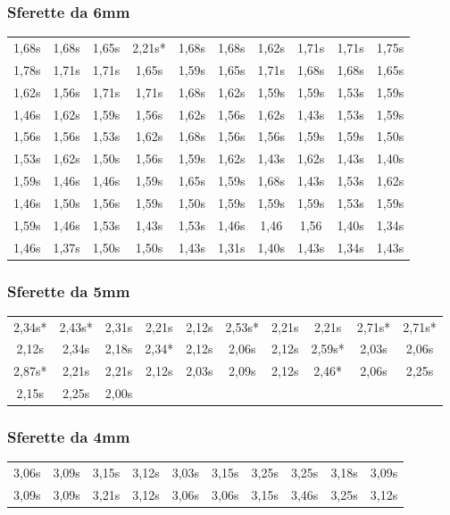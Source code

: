 \subsubsection{Sferette da 6mm}
\begin{tabular}{c|c|c|c|c|c|c|c|c|c}
\toprule
 1,68s & 1,68s & 1,65s & 2,21s* & 1,68s & 1,68s & 1,62s & 1,71s & 1,71s & 1,75s \\
 1,78s & 1,71s & 1,71s & 1,65s & 1,59s  & 1,65s  & 1,71s  & 1,68s & 1,68s & 1,65s \\
\midrule
 1,62s & 1,56s & 1,71s & 1,71s & 1,68s & 1,62s & 1,59s & 1,59s & 1,53s & 1,59s \\
 1,46s & 1,62s & 1,59s & 1,56s & 1,62s & 1,56s & 1,62s & 1,43s & 1,53s & 1,59s \\
\midrule
 1,56s & 1,56s & 1,53s & 1,62s & 1,68s & 1,56s & 1,56s & 1,59s & 1,59s & 1,50s\\
 1,53s & 1,62s & 1,50s & 1,56s & 1,59s & 1,62s & 1,43s & 1,62s & 1,43s & 1,40s \\
\midrule
 1,59s & 1,46s & 1,46s & 1,59s & 1,65s & 1,59s & 1,68s & 1,43s & 1,53s & 1,62s \\
 1,46s & 1,50s & 1,56s & 1,59s & 1,50s & 1,59s  & 1,59s & 1,59s & 1,53s & 1,59s \\
\midrule
1,59s & 1,46s & 1,53s & 1,43s & 1,53s & 1,46s & 1,46 & 1,56 & 1,40s & 1,34s \\
1,46s & 1,37s  & 1,50s   & 1,50s  & 1,43s & 1,31s & 1,40s  & 1,43s  & 1,34s & 1,43s \\
\bottomrule
\end{tabular}
\subsubsection{Sferette da 5mm}
\begin{tabular}{c|c|c|c|c|c|c|c|c|c}
\toprule
 2,34s* & 2,43s* & 2,31s & 2,21s & 2,12s & 2,53s* & 2,21s & 2,21s & 2,71s* & 2,71s* \\
 2,12s & 2,34s & 2,18s & 2,34* & 2,12s & 2,06s & 2,12s & 2,59s* & 2,03s & 2,06s \\
\midrule
 2,87s* & 2,21s & 2,21s & 2,12s & 2,03s & 2,09s & 2,12s & 2,46* & 2,06s & 2,25s \\
 2,15s & 2,25s & 2,00s &  &  &  &  &  &  & \\
\bottomrule
\end{tabular}
\subsubsection{Sferette da 4mm}
\begin{tabular}{c|c|c|c|c|c|c|c|c|c}
\toprule
 3,06s & 3,09s & 3,15s & 3,12s & 3,03s & 3,15s & 3,25s & 3,25s & 3,18s & 3,09s \\
 3,09s & 3,09s & 3,21s & 3,12s & 3,06s & 3,06s & 3,15s & 3,46s & 3,25s & 3,12s \\
\bottomrule
\end{tabular}
